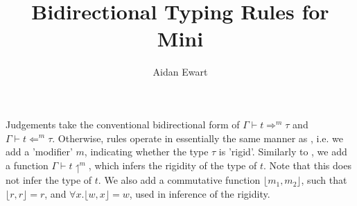 \documentclass{article}
\title{\textbf{Bidirectional Typing Rules for Mini}}
\author{Aidan Ewart}
\begin{document}
\maketitle

Judgements take the conventional bidirectional form of $\Gamma \vdash t \Rightarrow^m \tau$ and $\Gamma \vdash t \Leftarrow^m \tau$.
Otherwise, rules operate in essentially the same manner as \cite{GADT:1}, i.e. we add a 'modifier' $m$, indicating whether the type $\tau$ is 'rigid'.
Similarly to \cite{GADT:1}, we add a function $\Gamma \vdash t \upharpoonleft^m$, which infers the rigidity of the type of $t$.
Note that this does not infer the type of $t$. We also add a commutative function $\lfloor m_1, m_2 \rfloor$, such that $\lfloor r, r \rfloor = r$,
and $\forall x. \lfloor w, x \rfloor = w$, used in inference of the rigidity.

\medskip

\end{document}
